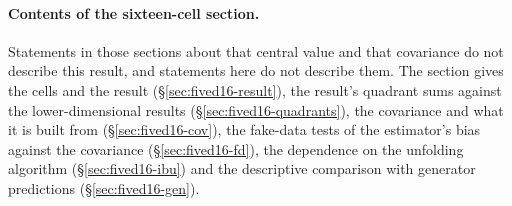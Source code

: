 \paragraph{Contents of the sixteen-cell section.} Statements in those sections about that central value and that covariance do not describe this result, and statements here do not describe them. The section gives the cells and the result (\S\ref{sec:fived16-result}), the result's quadrant sums against the lower-dimensional results (\S\ref{sec:fived16-quadrants}), the covariance and what it is built from (\S\ref{sec:fived16-cov}), the fake-data tests of the estimator's bias against the covariance (\S\ref{sec:fived16-fd}), the dependence on the unfolding algorithm (\S\ref{sec:fived16-ibu}) and the descriptive comparison with generator predictions (\S\ref{sec:fived16-gen}).

